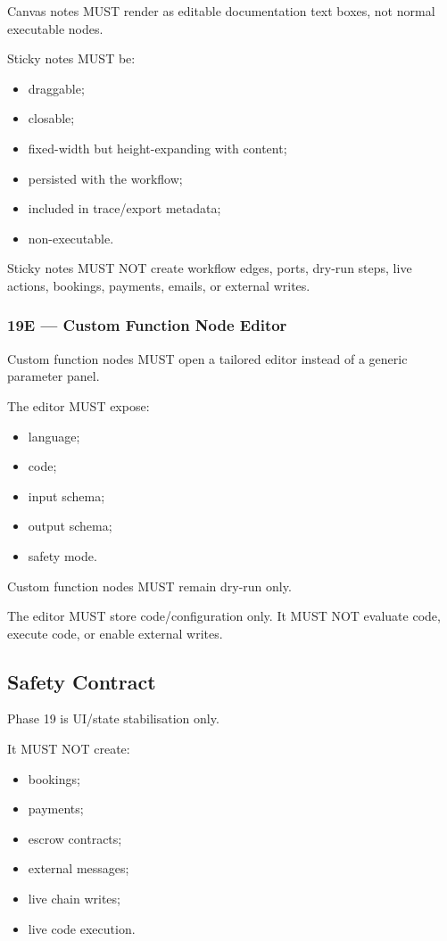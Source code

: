 Canvas notes MUST render as editable documentation text boxes, not normal executable nodes.

Sticky notes MUST be:

\begin{itemize}
  \item draggable;
  \item closable;
  \item fixed-width but height-expanding with content;
  \item persisted with the workflow;
  \item included in trace/export metadata;
  \item non-executable.
\end{itemize}

Sticky notes MUST NOT create workflow edges, ports, dry-run steps, live actions, bookings, payments, emails, or external writes.

\subsubsection{19E --- Custom Function Node Editor}

Custom function nodes MUST open a tailored editor instead of a generic parameter panel.

The editor MUST expose:

\begin{itemize}
  \item language;
  \item code;
  \item input schema;
  \item output schema;
  \item safety mode.
\end{itemize}

Custom function nodes MUST remain dry-run only.

The editor MUST store code/configuration only. It MUST NOT evaluate code, execute code, or enable external writes.

\subsection{Safety Contract}

Phase 19 is UI/state stabilisation only.

It MUST NOT create:

\begin{itemize}
  \item bookings;
  \item payments;
  \item escrow contracts;
  \item external messages;
  \item live chain writes;
  \item live code execution.
\end{itemize}

